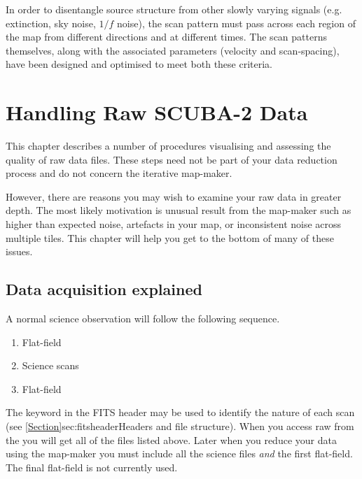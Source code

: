 \documentclass[11pt,oneside,chapters]{starlink}
\begin{document}
In order to disentangle source structure from other
slowly varying signals (e.g. extinction, sky noise, $1/f$ noise), the
scan pattern must pass across each region of the map from different
directions and at different times. The scan patterns themselves, along
with the associated parameters (velocity and scan-spacing), have been
designed and optimised to meet both these criteria.


\chapter{Handling Raw SCUBA-2 Data}
\label{sec:raw}

This chapter describes a number of procedures visualising and
assessing the quality of raw data files.  These steps need not be part
of your data reduction process and do not concern the iterative
map-maker.

However, there are reasons you may wish to examine your raw data in
greater depth. The most likely motivation is unusual result from the
map-maker such as higher than expected noise, artefacts in your map,
or inconsistent noise across multiple tiles.  This chapter will help
you get to the bottom of many of these issues.

\section{Data acquisition explained}
A normal science observation will follow the following sequence.

\begin{enumerate}\itemsep-0.2em
\item Flat-field
\item Science scans
\item Flat-field
\end{enumerate}

The  keyword in the FITS header may be used to
identify the nature of each scan (see
\cref{Section}{sec:fitsheader}{Headers and file structure}).  When you
access raw from the  you
will get all of the files listed above. Later when you reduce your
data using the map-maker you must include all the science files
\emph{and} the first flat-field.  The final flat-field is not
currently used.
\end{document}
